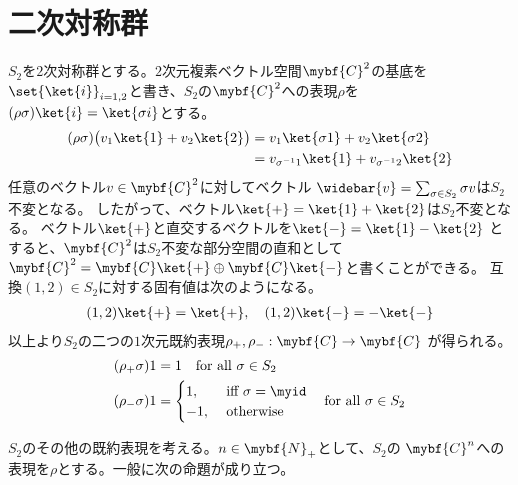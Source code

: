 \section{二次対称群}\label{s1:二次対称群} %
	$S_2$を$2$次対称群とする。$2$次元複素ベクトル空間$\mybf{C}^2$の基底を
	$\set{\ket{i}}_{i=1,2}$と書き、$S_2$の$\mybf{C}^2$への表現$\rho$を
	$(\rho\sigma)\ket{i}=\ket{\sigma i}$とする。
	\begin{equation*}\begin{split} %
		(\rho\sigma)\bigl(v_1\ket{1}+v_2\ket{2}\bigr)
		&= v_1\ket{\sigma1}+v_2\ket{\sigma2} \\
		&= v_{\sigma^{-1}1}\ket{1}+v_{\sigma^{-1}2}\ket{2} \\
	\end{split}\end{equation*} %
	任意のベクトル$v\in\mybf{C}^2$に対してベクトル
	$\widebar{v}=\sum_{\sigma\in S_2}\sigma v$は$S_2$不変となる。
	したがって、ベクトル$\ket{+}=\ket{1}+\ket{2}$は$S_2$不変となる。
	ベクトル$\ket{+}$と直交するベクトルを$\ket{-}=\ket{1}-\ket{2}$
	とすると、$\mybf{C}^2$は$S_2$不変な部分空間の直和として
	$\mybf{C}^2=\mybf{C}\ket{+}\oplus\mybf{C}\ket{-}$と書くことができる。
	互換$(1,2)\in S_2$に対する固有値は次のようになる。
	\begin{equation*}\begin{split} %
		(1,2)\ket{+} = \ket{+},\quad (1,2)\ket{-} = -\ket{-}
	\end{split}\end{equation*} %
	以上より$S_2$の二つの$1$次元既約表現$\rho_+,\rho_-:\mybf{C}\to\mybf{C}$
	が得られる。
	\begin{equation}\label{eq:二次対称群の既約表現}\begin{split} %
		(\rho_+\sigma)1 &= 1 \quad\text{for all }\sigma\in S_2 \\
		(\rho_-\sigma)1 &= \begin{cases}
			1, &\text{ iff }\sigma=\myid \\
			-1, &\text{ otherwise } \\
		\end{cases} \quad\text{for all }\sigma\in S_2
	\end{split}\end{equation} %

	$S_2$のその他の既約表現を考える。$n\in\mybf{N}_+$として、$S_2$の
	$\mybf{C}^n$への表現を$\rho$とする。一般に次の命題が成り立つ。

